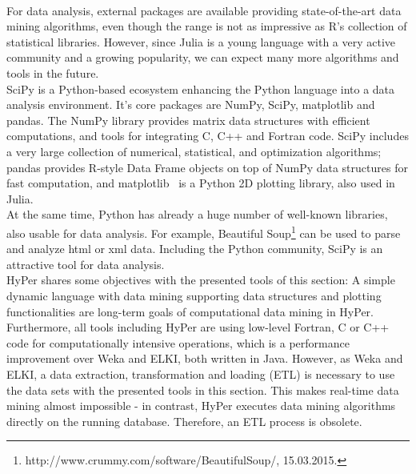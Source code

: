 \\
For data analysis, external packages are available providing state-of-the-art data mining algorithms, even though the range is not as impressive as R's collection of statistical libraries. However, since Julia is a young language with a very active community and a growing popularity, we can expect many more algorithms and tools in the future.
\\
SciPy is a Python-based ecosystem enhancing the Python language into a data analysis environment. It's core packages are NumPy, SciPy, matplotlib and pandas. The NumPy library provides matrix data structures with efficient computations, and tools for integrating C, C++ and Fortran code.
SciPy includes a very large collection of numerical, statistical, and optimization algorithms; pandas provides R-style Data Frame objects on top of NumPy data structures for fast computation, and matplotlib~\parencite{Hunter:2007} is a Python 2D plotting library, also used in Julia. 
\\
At the same time, Python has already a huge number of well-known libraries, also usable for data analysis. For example, Beautiful Soup\footnote{http://www.crummy.com/software/BeautifulSoup/, 15.03.2015.} can be used to parse and analyze html or xml data. Including the Python community, SciPy is an attractive tool for data analysis.
\\
HyPer shares some objectives with the presented tools of this section: A simple dynamic language with data mining supporting data structures and plotting functionalities are long-term goals of computational data mining in HyPer. Furthermore, all tools including HyPer are using low-level Fortran, C or C++ code for computationally intensive operations, which is a performance improvement over Weka and ELKI, both written in Java. However, as Weka and ELKI, a data extraction, transformation and loading (ETL) is necessary to use the data sets with the presented tools in this section. This makes real-time data mining almost impossible - in contrast, HyPer executes data mining algorithms directly on the running database. Therefore, an ETL process is obsolete.


